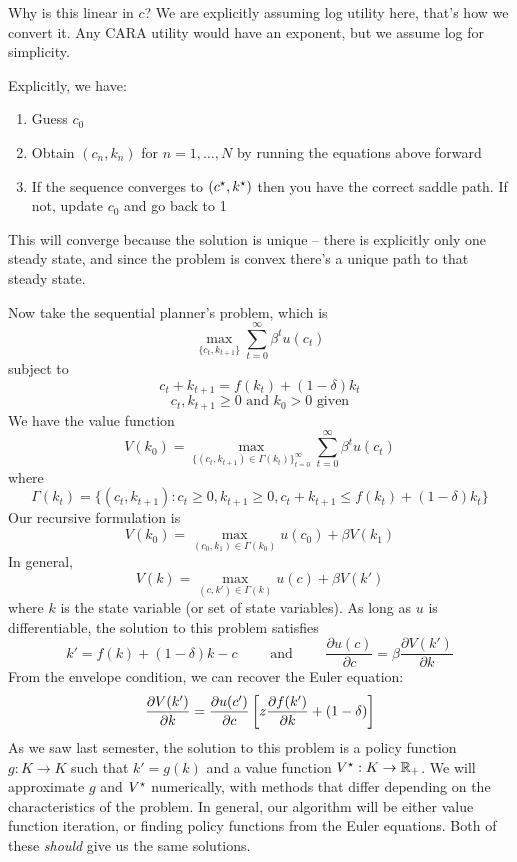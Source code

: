 \documentclass[10pt]{article}
\begin{document}
\begin{remark}
	Why is this linear in $c$? We are explicitly assuming log utility here, that's how we convert it. Any CARA utility would have an exponent, but we assume log for simplicity.
\end{remark}
Explicitly, we have:

\begin{algorithm}
	\begin{enumerate}
		\item Guess $c_0$
		\item Obtain $(c_n,k_n)$ for $n = 1 ,\dots,N$ by running the equations above forward
		\item If the sequence converges to $(c^\star,k^\star)$  then you have the correct saddle path. If not, update $c_0$ and go back to 1
	\end{enumerate}
	This will converge because the solution is unique -- there is explicitly only one steady state, and since the problem is convex there's a unique path to that steady state.
\end{algorithm}

Now take the sequential planner's problem, which is 
\[
\max_{\{c_t,k_{t+1}\}} \sum_{t=0}^\infty \beta^t u(c_t)
\]
subject to
\[
c_t + k_{t+1} = f(k_t) + (1-\delta)k_t
\]
\[
c_t,k_{t+1} \ge 0 \text{ and } k_0 > 0 \text{ given}
\]
We have the value function
\[
V(k_0) = \max_{\{(c_t,k_{t+1}) \in \Gamma(k_t)\}_{t=0}^\infty} \sum_{t=0}^\infty \beta^t u(c_t)
\]
where
\[
\Gamma(k_t) = \{(c_t,k_{t+1}) : c_t \ge 0,k_{t+1} \ge 0,c_t + k_{t+1} \le f(k_t) + (1-\delta)k_t\}
\]
Our recursive formulation is
\[
V(k_0) = \max_{(c_0,k_1) \in \Gamma(k_0)} u(c_0) + \beta V(k_1)
\]
In general,
\[
V(k) = \max_{(c,k') \in \Gamma(k)} u(c) + \beta V(k')
\]
where $k$ is the state variable (or set of state variables). As long as $u$ is differentiable, the solution to this problem satisfies
\[
k' = f(k) + (1-\delta)k - c \qquad \text{ and } \qquad \frac{\partial u(c)}{\partial c} = \beta \frac{\partial V(k')}{\partial k}
\]
From the envelope condition, we can recover the Euler equation:
\[
\frac{\partial V(k')}{\partial k} = \frac{\partial u(c')}{\partial c}\left[ z \frac{\partial f(k')}{\partial k} + (1-\delta)\right]
\]
As we saw last semester, the solution to this problem is a policy function $g: K \to K$ such that $k' = g(k)$ and a value function $V^\star : K \to \mathbb{R}_+$. We will approximate $g$ and $V^\star$ numerically, with methods that differ depending on the characteristics of the problem. In general, our algorithm will be either value function iteration, or finding policy functions from the Euler equations. Both of these \emph{should} give us the same solutions.
\end{document}
